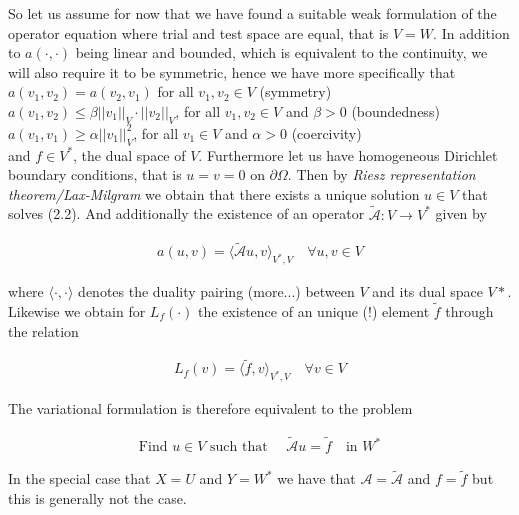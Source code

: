 \documentclass[../draft_1.tex]{subfiles}
\begin{document}
So let us assume for now that we have found a suitable weak formulation of the operator equation where trial and test space are equal, that is $V = W$. In addition to $a(\cdot, \cdot)$ being linear and bounded, which is equivalent to the continuity, we will also require it to be symmetric, hence we have more specifically that
\bigskip
\\
$a(v_1, v_2) = a(v_2, v_1)$ for all  $v_1, v_2 \in V$ (symmetry) \\
$a(v_1, v_2) \leq \beta ||v_1||_V \cdot ||v_2||_V $, for all $v_1, v_2 \in V$ and $\beta > 0$ (boundedness) \\ $a(v_1, v_1) \geq \alpha ||v_1||_V^2$, for all $v_1 \in V$ and $\alpha > 0$ (coercivity)
\bigskip
\\
and $f \in V^*$, the dual space of $V$. Furthermore let us have homogeneous Dirichlet boundary conditions, that is $u = v = 0$ on $\partial \Omega$. Then by \textit{Riesz representation theorem/Lax-Milgram} we obtain that there exists a unique solution $u \in V$ that solves (2.2). And additionally the existence of an operator $\tilde{\mathcal{A}} : V \rightarrow V^*$ given by
\begin{ceqn}
\begin{align}
a(u,v) = \langle \tilde{\mathcal{A}} u, v \rangle_{V^*, V} \quad \forall u, v \in V
\end{align}
\end{ceqn}
where $\langle \cdot, \cdot \rangle$ denotes the duality pairing (more...) between $V$ and its dual space $V*$. Likewise we obtain for $L_f(\cdot)$ the existence of an unique (!) element $\tilde{f}$ through the relation
\begin{ceqn}
\begin{align}
L_f(v) = \langle \tilde{f}, v \rangle_{V^*, V} \quad \forall v \in V
\end{align} 
\end{ceqn}
The variational formulation is therefore equivalent to the problem 
\begin{ceqn}
\begin{align}
\text{Find } u \in V \text{ such that } \quad \tilde{\mathcal{A}} u = \tilde{f} \quad  \text{in } W^*
\end{align}
\end{ceqn}
In the special case that $X = U$ and $Y = W^*$ we have that $ \mathcal{A} = \tilde{\mathcal{A}}$ and $ f = \tilde{f}$ but this is generally not the case. 
\end{document}
